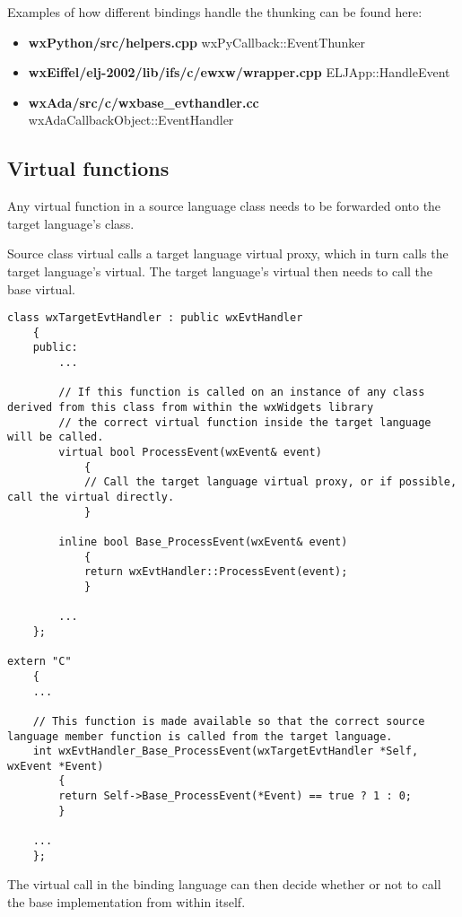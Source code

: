 Examples of how different bindings handle the thunking can be found here:

\begin{itemize}\itemsep=0pt
\item{\bf wxPython/src/helpers.cpp} wxPyCallback::EventThunker
\item{\bf wxEiffel/elj-2002/lib/ifs/c/ewxw/wrapper.cpp} ELJApp::HandleEvent
\item{\bf wxAda/src/c/wxbase_evthandler.cc} wxAdaCallbackObject::EventHandler
\end{itemize}

\subsection{Virtual functions}\label{virtualfunctions}

Any virtual function in a source language class needs to be forwarded onto the target language's class.

Source class virtual calls a target language virtual proxy, which in turn calls the target language's virtual. The target language's
virtual then needs to call the base virtual.

{\small
\begin{verbatim}
class wxTargetEvtHandler : public wxEvtHandler
	{
	public:
		...
		
		// If this function is called on an instance of any class derived from this class from within the wxWidgets library
		// the correct virtual function inside the target language will be called.
		virtual bool ProcessEvent(wxEvent& event)
			{
			// Call the target language virtual proxy, or if possible, call the virtual directly.
			}
		
		inline bool Base_ProcessEvent(wxEvent& event)
			{
			return wxEvtHandler::ProcessEvent(event);
			}
			
		...
	};

extern "C"
	{
	...

	// This function is made available so that the correct source language member function is called from the target language.
 	int wxEvtHandler_Base_ProcessEvent(wxTargetEvtHandler *Self, wxEvent *Event)
		{
		return Self->Base_ProcessEvent(*Event) == true ? 1 : 0;
		}
	
	...
	};
\end{verbatim}
}%

The virtual call in the binding language can then decide whether or not to call the base implementation from within itself.

